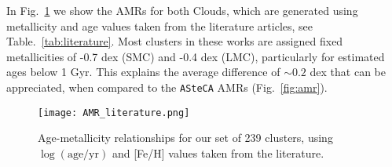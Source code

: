 \documentclass{aa}
\begin{document}
\begin{appendix}



In Fig.~\ref{fig:amr_lit} we show the AMRs for both Clouds, which are generated using
metallicity and age values taken from the literature articles, see
Table.~\ref{tab:literature}.
Most clusters in these works are assigned fixed metallicities of -0.7 dex (SMC)
and -0.4 dex (LMC), particularly for estimated ages below 1 Gyr. This explains
the average difference of ${\sim}0.2$ dex that can be appreciated, when compared
to the \texttt{ASteCA} AMRs (Fig.~\ref{fig:amr}).

\begin{figure}
\centering
\texttt{[image: AMR\_literature.png]}
\caption{Age-metallicity relationships for our set of 239 clusters, using
$\log\mathrm{(age/yr)}$ and [Fe/H] values taken from the literature.}
\label{fig:amr_lit}
\end{figure}

\end{appendix} 
\end{document}
